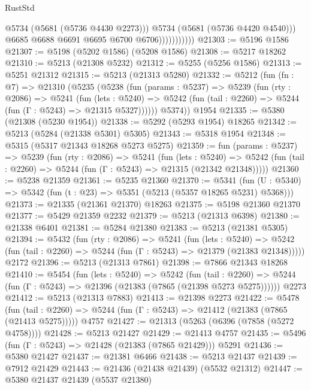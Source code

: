 \begin{lexlean}{RustStd}
\begin{coremodule}
                              @5734
                              (@5681 (@5736 @4430 @2273)))
                            @5734
                            (@5681 (@5736 @4420 @4540)))
                          @6685
                          @6688
                          @6691
                          @6695
                          @6700
                          @6706)))))))))))
@21303 := @5196 @1586
@21307 := @5198 (@5202 @1586) (@5208 @1586)
@21308 := @5217 @18262
@21310 := @5213 (@21308 @5232)
@21312 := @5255 (@5256 @1586)
@21313 := @5251 @21312
@21315 := @5213 (@21313 @5280)
@21332 := @5212
    (fun (fn : @7) =>
    @21310
      (@5235
        (@5238
          (fun (params : @5237) =>
          @5239
            (fun (rty : @2086) =>
            @5241
              (fun (lets : @5240) =>
              @5242 (fun (tail : @2260) => @5244 (fun (Γ : @5243) => @21315 @5327))))))
        @5374))
    @1954
@21335 := @5380 (@21308 (@5230 @1954))
@21338 := @5292 (@5293 @1954) @18265
@21342 := @5213 (@5284 (@21338 @5301) @5305)
@21343 := @5318 @1954
@21348 := @5315 (@5317 @21343 @18268 @5273 @5275)
@21359 := fun (params : @5237) =>
  @5239
    (fun (rty : @2086) =>
    @5241
      (fun (lets : @5240) =>
      @5242 (fun (tail : @2260) => @5244 (fun (Γ : @5243) => @21315 (@21342 @21348)))))
@21360 := @5238 @21359
@21361 := @5235 @21360
@21370 := @5341
    (fun (U : @5340) => @5342 (fun (t : @23) => @5351 (@5213 (@5357 @18265 @5231) @5368)))
@21373 := @21335 (@21361 @21370) @18263
@21375 := @5198 @21360 @21370
@21377 := @5429 @21359 @2232
@21379 := @5213 (@21313 @6398)
@21380 := @21338 @6401
@21381 := @5284 @21380
@21383 := @5213 (@21381 @5305)
@21394 := @5432
    (fun (rty : @2086) =>
    @5241
      (fun (lets : @5240) =>
      @5242 (fun (tail : @2260) => @5244 (fun (Γ : @5243) => @21379 (@21383 @21348)))))
    @2172
@21396 := @5213 (@21313 @7861)
@21398 := @7866 @21343 @18268
@21410 := @5454
    (fun (lets : @5240) =>
    @5242
      (fun (tail : @2260) =>
      @5244 (fun (Γ : @5243) => @21396 (@21383 (@7865 (@21398 @5273 @5275))))))
    @2273
@21412 := @5213 (@21313 @7883)
@21413 := @21398 @2273
@21422 := @5478
    (fun (tail : @2260) => @5244 (fun (Γ : @5243) => @21412 (@21383 (@7865 (@21413 @5275)))))
    @4757
@21427 := @21313 (@5263 (@6396 (@7858 (@5272 @4758))))
@21428 := @5213 @21427
@21429 := @21413 @4757
@21435 := @5496 (fun (Γ : @5243) => @21428 (@21383 (@7865 @21429))) @5291
@21436 := @5380 @21427
@21437 := @21381 @6466
@21438 := @5213 @21437
@21439 := @7912 @21429
@21443 := @21436 (@21438 @21439) (@5532 @21312)
@21447 := @5380 @21437 @21439 (@5537 @21380)

\end{coremodule}
\end{lexlean}
